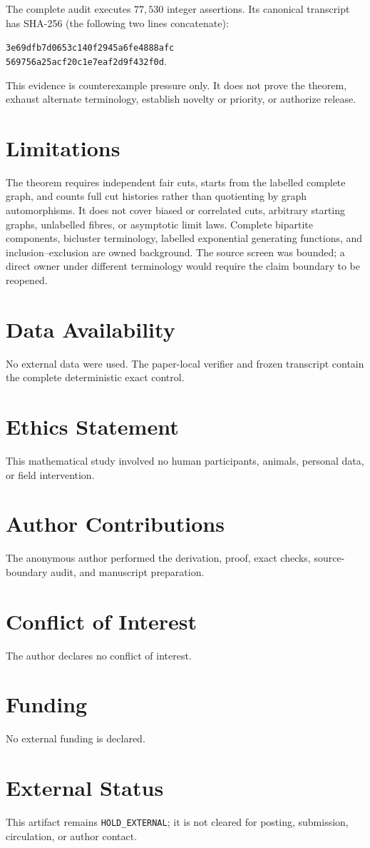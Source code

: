 \documentclass[a4paper,10pt]{amsart}
\theoremstyle{remark}
\begin{document}
The complete audit executes $77{,}530$ integer assertions.  Its canonical
transcript has SHA-256 (the following two lines concatenate):
\begin{center}
\small\texttt{3e69dfb7d0653c140f2945a6fe4888afc}\\[-2pt]
\small\texttt{569756a25acf20c1e7eaf2d9f432f0d}.
\end{center}
This evidence is counterexample pressure only.  It does not prove the
theorem, exhaust alternate terminology, establish novelty or priority, or
authorize release.

\section*{Limitations}
The theorem requires independent fair cuts, starts from the labelled complete
graph, and counts full cut histories rather than quotienting by graph
automorphisms.  It does not cover biased or correlated cuts, arbitrary
starting graphs, unlabelled fibres, or asymptotic limit laws.  Complete
bipartite components, bicluster terminology, labelled exponential generating
functions, and inclusion--exclusion are owned background.  The source screen
was bounded; a direct owner under different terminology would require the
claim boundary to be reopened.

\section*{Data Availability}
No external data were used.  The paper-local verifier and frozen transcript
contain the complete deterministic exact control.

\section*{Ethics Statement}
This mathematical study involved no human participants, animals, personal
data, or field intervention.

\section*{Author Contributions}
The anonymous author performed the derivation, proof, exact checks,
source-boundary audit, and manuscript preparation.

\section*{Conflict of Interest}
The author declares no conflict of interest.

\section*{Funding}
No external funding is declared.

\section*{External Status}
This artifact remains \texttt{HOLD\_EXTERNAL}; it is not cleared for posting,
submission, circulation, or author contact.



\end{document}
